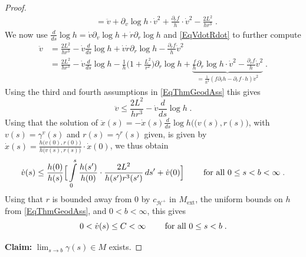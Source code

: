 \documentclass[reqno]{article}
\newcommand{\Hp}{\mathcal{H}^+}
\newcommand{\Mext}{M_{\mathrm{ext}}}
\newcommand{\rd}{\partial}
\begin{document}
\begin{proof}
\begin{equation*}
\begin{split}
&= \ddot{v} + \rd_v \log h \cdot \dot{v}^2 + \frac{\rd_r f}{h} \cdot \dot{v}^2 - \frac{2L^2}{h r^3} \;.
\end{split}
\end{equation*}
We now use $\frac{d}{ds} \log h = \dot{v} \rd_v \log h + \dot{r} \rd_r \log h$ and \eqref{EqVdotRdot} to further compute
\begin{equation*}
\begin{split}
\ddot{v} &= \frac{2L^2}{h r^3} - \dot{v} \frac{d}{ds} \log h + \dot{v} \dot{r} \rd_r \log h - \frac{\rd_r f}{h} \dot{v}^2 \\
&= \frac{2L^2}{h r^3} - \dot{v} \frac{d}{ds} \log h - \frac{1}{h} \big(1 + \frac{L^2}{r^2}\big) \rd_r \log h + \underbrace{\frac{f}{h} \rd_r \log h \cdot \dot{v}^2 - \frac{\rd_r f}{h} \dot{v}^2}_{= \frac{1}{h^2}(f \rd_r h - \rd_r f \cdot h) \dot{v}^2} \;.
\end{split}
\end{equation*}
Using the third and fourth assumptions in \eqref{EqThmGeodAss} this gives 
\begin{equation}
\label{EqVDD}
\ddot{v} \leq \frac{2L^2}{h r^3} - \dot{v} \frac{d}{ds} \log h \;.
\end{equation}
Using that the solution of $\ddot{x}(s) = - \dot{x}(s) \frac{d}{ds} \log h\big((v(s), r(s)\big)$, with $v(s)= \gamma^v(s)$ and $r(s) = \gamma^r(s)$ given, is given by $\dot{x}(s) = \frac{h\big(v(0), r(0)\big)}{h\big(v(s), r(s)\big)} \cdot \dot{x}(0)$, we thus obtain
\begin{equation}
\label{EqUBVD}
\dot{v}(s) \leq \frac{h(0)}{h(s)} \Big[ \int\limits_0^s \frac{h(s')}{h(0)} \cdot \frac{2L^2}{h(s') r^3(s')} \, ds' + \dot{v}(0)\Big]\qquad  \textnormal{ for all } 0 \leq s  < b < \infty \;.
\end{equation}
Using that $r$ is bounded away from $0$ by $c_{\Hp}$ in $\Mext$, the uniform bounds on $h$ from \eqref{EqThmGeodAss}, and $0<b< \infty$, this gives 
\begin{equation}
\label{EqUBVDResult}
0 < \dot{v}(s) \leq C < \infty \qquad \textnormal{ for all } 0 \leq s < b \;.
\end{equation}

\textbf{Claim:} $\lim_{s \to b} \gamma(s) \in M$ exists.


\end{proof}
\end{document}
